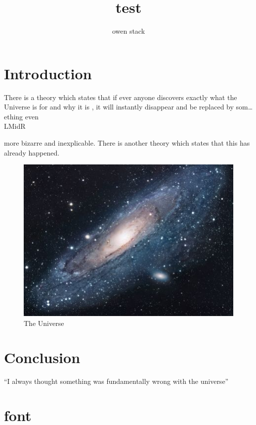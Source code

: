 \documentclass{article}
\title{test}
\author{owen stack}
\date{}
\begin{document}
\maketitle
\tableofcontents
\newpage

\section{Introduction}
 There is a theory which states that if ever anyone discovers exactly wh\hspace{2em}at the Universe is for an\raisebox{0.3em}d why \vspace{1em} it is , it will instantly disappear and be replaced by som\ldots ething even \\
L\hrulefill Mid\dotfill R


more bizarre and inexplicable.
There is  another theory which states that this has already happened.

\begin{figure}[htbp!]
\centering
\includegraphics[scale=1.7]{universe}
\caption{The Universe}
\label{fig:universe}
\end{figure}

\section{Conclusion}
``I always thought something was fundamentally wrong with the universe'' \citep{adams1995hitchhiker}




\section{font}
\end{document}

